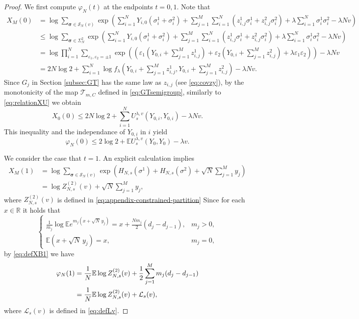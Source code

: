 \documentclass[11pt]{article}
\numberwithin{equation}{section}
\newcommand{\E}{\mathbb{E}}
\newcommand{\1}{\mathbf 1}
\begin{document}
\begin{proof}
We first compute $\varphi_N(t)$ at the endpoints $t=0,1$. 
Note that
\begin{align*}
X_M(0) &= \log\sum_{\boldsymbol\sigma\in{\mathcal{S}}_N(v)} \exp\left( \sum _{i=1}^N Y_{i,0}(\sigma _i^1 + \sigma _i^2) + \sum _{j=1}^M \sum _{i=1}^N (z_{i,j}^1 \sigma _i^1 + z_{i,j}^2 \sigma _i^2 ) +\lambda\sum_{i=1}^N\sigma_i^1\sigma_i^2-\lambda Nv \right) \\
%
&\leq \log \sum_{\boldsymbol\sigma \in\Sigma_N^2} \exp\left( \sum _{i=1}^N Y_{i,0}(\sigma _i^1 + \sigma _i^2) + \sum _{j=1}^M \sum _{i=1}^N (z_{i,j}^1 \sigma _i^1 + z_{i,j}^2 \sigma _i^2 ) +\lambda\sum_{i=1}^N\sigma_i^1\sigma_i^2-\lambda Nv \right) \\
%
&= \log \prod _{i=1}^N \sum _{\varepsilon _1, \varepsilon _2 = \pm 1}  \exp\left( \left( \varepsilon _1 \left( Y_{0,i} + \sum _{j=1}^M z_{i,j}^1 \right) + \varepsilon _2 \left( Y_{0,i} + \sum _{j=1}^M z_{i,j}^2 \right) + \lambda \varepsilon _1 \varepsilon _2 \right) \right) -\lambda N v \\
%
&= 2 N \log 2 + \sum _{i=1}^N \log f_\lambda \left( Y_{0,i} + \sum _{j=1}^M z_{i,j}^1 , Y_{0,i} + \sum _{j=1}^M z_{i,j}^2 \right) -\lambda N v .
\end{align*}
Since $G_j$ in Section \ref{subsec:GT} has the same law as $z_{i,j}$ (see \eqref{eq:covzy}), by the monotonicity of the map ${\mathcal T}_{m,C}$ defined in \eqref{eq:GTsemigroup}, similarly to \eqref{eq:relationXU} we obtain
\[
X_0(0) \leq 2 N \log 2 + \sum _{i=1}^N U_s^{\lambda ,v} (Y_{0,i}, Y_{0,i}) -\lambda N v .
\]
This inequality and the independance of $Y_{0,i}$ in $i$ yield
\begin{equation}
\varphi_N(0)
\leq
2\log2+\E U_s^{\lambda,v}(Y_0,Y_0)-\lambda v.
\label{eq:GT-endpoint-zero}
\end{equation}

We consider the case that $t=1$.
An explicit calculation implies
\begin{align*}
X_M(1) &= \log \sum_{\boldsymbol\sigma\in{\mathcal{S}}_N(v)} \exp \left( H_{N,s}(\sigma ^1) + H_{N,s}(\sigma ^2) + \sqrt{N} \sum _{j=1}^M y_j\right) \\
%
&= \log Z_{N,s}^{(2)}(v) + \sqrt{N} \sum _{j=1}^M y_j,
\end{align*}
where $Z_{N,s}^{(2)}(v)$ is defined in \eqref{eq:appendix-constrained-partition}
Since for each $x\in {\mathbb R}$ it holds that
\[
\begin{cases}
\displaystyle
\frac1{m_j}\log\E e^{m_j(x+\sqrt N\,y_j)}
=x+\frac{Nm_j}{2}(d_j-d_{j-1}),&m_j>0,\\[3mm]
\displaystyle
\E (x+\sqrt N\,y_j)=x,&m_j=0 ,
\end{cases}
\]
by \eqref{eq:defXB1} we have
\begin{align}
\varphi_N(1)
&=\frac1N\E\log Z_{N,s}^{(2)}(v)+\frac12\sum_{j=1}^Mm_j(d_j-d_{j-1})
\notag\\
&=\frac1N\E\log Z_{N,s}^{(2)}(v)+\mathcal L_s(v),
\label{eq:GT-endpoint-one}
\end{align}
where $\mathcal L_s(v)$ is defined in \eqref{eq:defLv}.


\end{proof}
\end{document}
